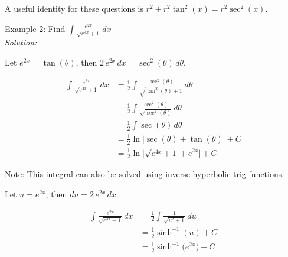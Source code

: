 \documentclass[16pt]{article}
\theoremstyle{remark}
\begin{document}
\begin{center}
\end{center}

A useful identity for these questions is $r^2 + r^2 \tan^2(x) = r^2 \sec^2(x)$.

\begin{mdframed}[style=TheoremFrame]
Example 2: Find $\displaystyle{ \int \frac{e^{2x}}{\sqrt{e^{4x}+1}} \, dx }$\\

\textit{Solution:}
\begin{center}
Let $e^{2x} = \tan(\theta)$, then $2\, e^{2x}\, dx = \sec^2(\theta)\, d\theta $.
\end{center}
\begin{align*}
\int \frac{e^{2x}}{\sqrt{e^{4x}+1}} \, dx &= \frac{1}{2} \int \frac{\sec^2(\theta)}{\sqrt{\tan^2(\theta)+1}} \, d\theta \\[2ex]
&= \frac{1}{2} \int \frac{\sec^2(\theta)}{\sqrt{\sec^2(\theta)}} \, d\theta \\[2ex]
&= \frac{1}{2} \int \sec(\theta)\, d\theta \\[2ex]
&= \frac{1}{2} \ln\big| \sec(\theta) + \tan(\theta) \big| + C\\[2ex]
&= \frac{1}{2} \ln\bigg| \sqrt{e^{4x}+1} + e^{2x} \bigg| + C
\end{align*}

Note: This integral can also be solved using inverse hyperbolic trig functions.

\begin{center}
Let $u = e^{2x}$, then $du = 2 \, e^{2x} \, dx$.
\end{center}
\begin{align*}
\int \frac{e^{2x}}{\sqrt{e^{4x}+1}} \, dx &= \frac{1}{2} \int \frac{1}{\sqrt{u^2+1}} \, du \\[2ex]
&= \frac{1}{2} \sinh^{-1} (u) + C\\[2ex]
&= \frac{1}{2} \sinh^{-1} \big(e^{2x}\big) + C
\end{align*}
\end{mdframed}
\end{document}
